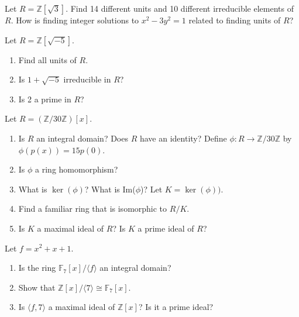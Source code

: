 \documentclass[12pt,letterpaper,boxed]{hmcpset}
\begin{document}

\begin{problem}[18.1.20]
Let $R = \mathbb{Z}[\sqrt{3}]$. Find 14 different units and 10 different irreducible elements of $R$. How is finding integer solutions to $x^2 - 3y^2 = 1$ related to finding units of $R$?
\end{problem}

\begin{solution}
\end{solution}

\clearpage

\begin{problem}[18.1.21]
Let $R = \mathbb{Z}[\sqrt{-5}]$.
\begin{enumerate}[label=\alph*]
\item Find all units of $R$.
\item Is $1 + \sqrt{-5}$ irreducible in $R$?
\item Is 2 a prime in $R$?
\end{enumerate}
\end{problem}

\begin{solution}
\end{solution}

\clearpage

\begin{problem}[18.1.27]
Let $R = (\mathbb{Z}/30\mathbb{Z})[x]$.
\begin{enumerate}[label=\alph*]
\item Is $R$ an integral domain? Does  $R$ have an identity?
\newline Define $\phi: R \rightarrow \mathbb{Z}/30\mathbb{Z}$ by $\phi(p(x)) = 15p(0)$.
\item Is $\phi$ a ring homomorphism?
\item What is $\ker(\phi)$? What is Im($\phi$)?
\newline Let $K = \ker(\phi))$.
\item Find a familiar ring that is isomorphic to $R/K$.
\item Is $K$ a maximal ideal of $R$? Is $K$ a prime ideal of $R$?
\end{enumerate}
\end{problem}

\begin{solution}
\end{solution}

\clearpage

\begin{problem}[18.1.29]
Let $f = x^2 + x + 1$.
\begin{enumerate}[label=\alph*]
\item Is the ring $\mathbb{F}_7[x]/\langle f \rangle$ an integral domain?
\item Show that $\mathbb{Z}[x]/\langle 7 \rangle \cong \mathbb{F}_7[x]$.
\item Is $\langle f,7 \rangle $ a maximal ideal of $\mathbb{Z}[x]$? Is it a prime ideal?
\end{enumerate}
\end{problem}
\end{document}
